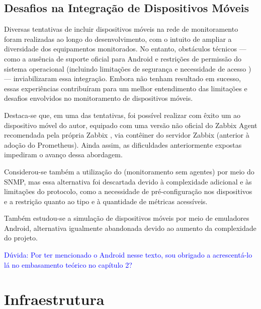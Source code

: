 {\color{red}

\subsection{Desafios na Integração de Dispositivos Móveis}
\label{subsection:DesafiosDispositivosMoveis}

Diversas tentativas de incluir dispositivos móveis na rede de monitoramento foram realizadas ao longo do desenvolvimento, com o intuito de ampliar a diversidade dos equipamentos monitorados. No entanto, obstáculos técnicos --- como a ausência de suporte oficial para Android e restrições de permissão do sistema operacional (incluindo limitações de segurança e necessidade de acesso ) --- inviabilizaram essa integração. Embora não tenham resultado em sucesso, essas experiências contribuíram para um melhor entendimento das limitações e desafios envolvidos no monitoramento de dispositivos móveis.

Destaca-se que, em uma das tentativas, foi possível realizar com êxito um  ao dispositivo móvel do autor, equipado com uma versão não oficial do Zabbix Agent recomendada pela própria Zabbix \citep{unofficialzabbixagent2025}, via contêiner do servidor Zabbix (anterior à adoção do Prometheus). Ainda assim, as dificuldades anteriormente expostas impediram o avanço dessa abordagem.

Considerou-se também a utilização do  (monitoramento sem agentes) por meio do SNMP, mas essa alternativa foi descartada devido à complexidade adicional e às limitações do protocolo, como a necessidade de pré-configuração nos dispositivos e a restrição quanto ao tipo e à quantidade de métricas acessíveis.

Também estudou-se a simulação de dispositivos móveis por meio de emuladores Android, alternativa igualmente abandonada devido ao aumento da complexidade do projeto.
}

\textcolor{blue}{Dúvida: Por ter mencionado o Android nesse texto, sou obrigado a acrescentá-lo lá no embasamento teórico no capítulo 2?}



\section{Infraestrutura}

